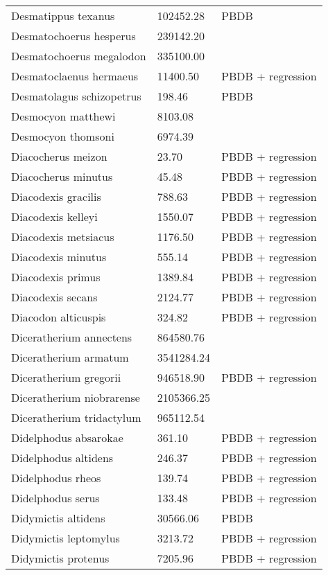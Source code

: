 \begin{center}
\begin{longtable}{p{} p{} p{} }
  Desmatippus texanus & 102452.28 & PBDB \\ 
  Desmatochoerus hesperus & 239142.20 & \cite{McGrew1939} \\ 
  Desmatochoerus megalodon & 335100.00 & \cite{McKenna2011} \\ 
  Desmatoclaenus hermaeus & 11400.50 & PBDB + regression \\ 
  Desmatolagus schizopetrus & 198.46 & PBDB \\ 
  Desmocyon matthewi & 8103.08 & \cite{Tomiya2013} \\ 
  Desmocyon thomsoni & 6974.39 & \cite{Tomiya2013} \\ 
  Diacocherus meizon & 23.70 & PBDB + regression \\ 
  Diacocherus minutus & 45.48 & PBDB + regression \\ 
  Diacodexis gracilis & 788.63 & PBDB + regression \\ 
  Diacodexis kelleyi & 1550.07 & PBDB + regression \\ 
  Diacodexis metsiacus & 1176.50 & PBDB + regression \\ 
  Diacodexis minutus & 555.14 & PBDB + regression \\ 
  Diacodexis primus & 1389.84 & PBDB + regression \\ 
  Diacodexis secans & 2124.77 & PBDB + regression \\ 
  Diacodon alticuspis & 324.82 & PBDB + regression \\ 
  Diceratherium annectens & 864580.76 & \cite{Tomiya2013} \\ 
  Diceratherium armatum & 3541284.24 & \cite{Tomiya2013} \\ 
  Diceratherium gregorii & 946518.90 & PBDB + regression \\ 
  Diceratherium niobrarense & 2105366.25 & \cite{Tomiya2013} \\ 
  Diceratherium tridactylum & 965112.54 & \cite{Tomiya2013} \\ 
  Didelphodus absarokae & 361.10 & PBDB + regression \\ 
  Didelphodus altidens & 246.37 & PBDB + regression \\ 
  Didelphodus rheos & 139.74 & PBDB + regression \\ 
  Didelphodus serus & 133.48 & PBDB + regression \\ 
  Didymictis altidens & 30566.06 & PBDB \\ 
  Didymictis leptomylus & 3213.72 & PBDB + regression \\ 
  Didymictis protenus & 7205.96 & PBDB + regression \\ 

\end{longtable}
\end{center}
